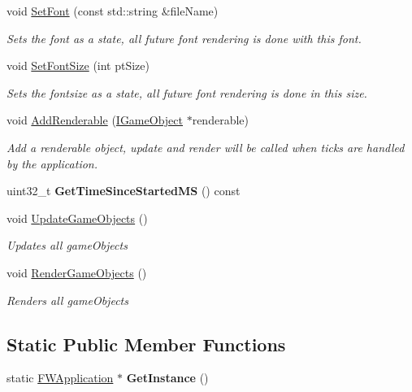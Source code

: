 \begin{DoxyCompactItemize}
void \hyperlink{class_f_w_application_a014258fb16a8eb170f38469bfb369166}{Set\+Font} (const std\+::string \&file\+Name)
\begin{DoxyCompactList}\small\item\em Sets the font as a state, all future font rendering is done with this font. \end{DoxyCompactList}\item 
void \hyperlink{class_f_w_application_ae59b00bb00d57974a74846af02fc58db}{Set\+Font\+Size} (int pt\+Size)
\begin{DoxyCompactList}\small\item\em Sets the fontsize as a state, all future font rendering is done in this size. \end{DoxyCompactList}\item 
void \hyperlink{class_f_w_application_a97b8073420aec9a721408bde5d31ee9f}{Add\+Renderable} (\hyperlink{class_i_game_object}{I\+Game\+Object} $\ast$renderable)
\begin{DoxyCompactList}\small\item\em Add a renderable object, update and render will be called when ticks are handled by the application. \end{DoxyCompactList}\item 
\hypertarget{class_f_w_application_a40ce413be238be95a8815b0d0a474d75}{uint32\+\_\+t {\bfseries Get\+Time\+Since\+Started\+M\+S} () const }\label{class_f_w_application_a40ce413be238be95a8815b0d0a474d75}

\item 
void \hyperlink{class_f_w_application_a57e09a281fc706a0622f7204aaeb6bbe}{Update\+Game\+Objects} ()
\begin{DoxyCompactList}\small\item\em Updates all game\+Objects \end{DoxyCompactList}\item 
void \hyperlink{class_f_w_application_a1a9208982cc76086430616eaf7e88568}{Render\+Game\+Objects} ()
\begin{DoxyCompactList}\small\item\em Renders all game\+Objects \end{DoxyCompactList}\end{DoxyCompactItemize}
\subsection*{Static Public Member Functions}
\begin{DoxyCompactItemize}
\item 
\hypertarget{class_f_w_application_ad52cf42e501e932275bca974ca32f4f7}{static \hyperlink{class_f_w_application}{F\+W\+Application} $\ast$ {\bfseries Get\+Instance} ()}\label{class_f_w_application_ad52cf42e501e932275bca974ca32f4f7}

\end{DoxyCompactItemize}


